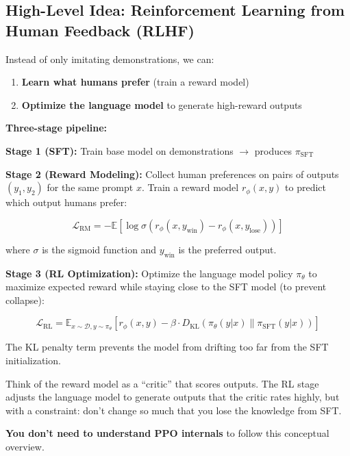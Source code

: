 \documentclass{article}
\begin{document}
\subsection{High-Level Idea: Reinforcement Learning from Human Feedback (RLHF)}

Instead of only imitating demonstrations, we can:

\begin{enumerate}
\item \textbf{Learn what humans prefer} (train a reward model)
\item \textbf{Optimize the language model} to generate high-reward outputs
\end{enumerate}

\textbf{Three-stage pipeline:}

\begin{center}
\end{center}

\textbf{Stage 1 (SFT):} Train base model on demonstrations $\rightarrow$ produces $\pi_{\text{SFT}}$

\textbf{Stage 2 (Reward Modeling):} Collect human preferences on pairs of outputs $(y_1, y_2)$ for the same prompt $x$. Train a reward model $r_\phi(x, y)$ to predict which output humans prefer:

\begin{equation}
\mathcal{L}_{\text{RM}} = -\mathbb{E} \left[ \log \sigma\left(r_\phi(x, y_{\text{win}}) - r_\phi(x, y_{\text{lose}})\right) \right]
\end{equation}

where $\sigma$ is the sigmoid function and $y_{\text{win}}$ is the preferred output.

\textbf{Stage 3 (RL Optimization):} Optimize the language model policy $\pi_\theta$ to maximize expected reward while staying close to the SFT model (to prevent collapse):

\begin{equation}
\mathcal{L}_{\text{RL}} = \mathbb{E}_{x \sim \mathcal{D}, y \sim \pi_\theta} \left[ r_\phi(x, y) - \beta \cdot D_{\text{KL}}\left(\pi_\theta(y|x) \| \pi_{\text{SFT}}(y|x)\right) \right]
\end{equation}

The KL penalty term prevents the model from drifting too far from the SFT initialization.

\begin{tcolorbox}[colback=blue!5!white, colframe=blue!50!black, title=Intuition Without RL Theory]
Think of the reward model as a ``critic'' that scores outputs. The RL stage adjusts the language model to generate outputs that the critic rates highly, but with a constraint: don't change so much that you lose the knowledge from SFT.

\textbf{You don't need to understand PPO internals} to follow this conceptual overview.
\end{tcolorbox}
\end{document}
